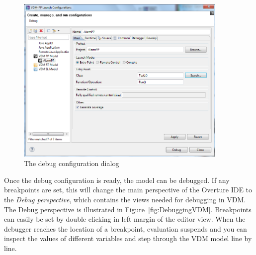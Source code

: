 \begin{figure}[htp]
\begin{center}
  \includegraphics[width=4in]{figures/debugConfiguration}
  \caption{The debug configuration dialog}
  \label{fig:debugConfiguration}
\end{center}
\end{figure}
%
Once the debug configuration is ready, the model can be debugged. If any breakpoints are set, this will change the main perspective of the Overture IDE to the \emph{Debug perspective}, which contains the views needed for debugging in VDM. The Debug perspective is illustrated in Figure~\ref{fig:DebuggingVDM}. Breakpoints can easily be set by double clicking in left margin of the editor view. When the debugger reaches the location of a breakpoint, evaluation suspends and you can inspect the values of different variables and step through the VDM model line by line.
%
